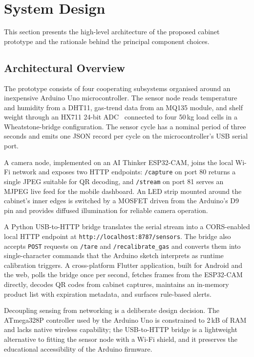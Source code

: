 \section{System Design}
\label{sec:systemdesign}

This section presents the high-level architecture of the proposed
cabinet prototype and the rationale behind the principal component
choices.

\subsection{Architectural Overview}

The prototype consists of four cooperating subsystems organised
around an inexpensive Arduino Uno microcontroller. The sensor node
reads temperature and humidity from a DHT11, gas-trend data from an
MQ135 module, and shelf weight through an HX711 24-bit
ADC~\cite{hx711datasheet} connected to four 50\,kg load cells in a
Wheatstone-bridge configuration. The sensor cycle has a nominal
period of three seconds and emits one JSON record per cycle on the
microcontroller's USB serial port.

A camera node, implemented on an AI Thinker ESP32-CAM, joins the
local Wi-Fi network and exposes two HTTP endpoints: \texttt{/capture}
on port 80 returns a single JPEG suitable for QR decoding, and
\texttt{/stream} on port 81 serves an MJPEG live feed for the mobile
dashboard. An LED strip mounted around the cabinet's inner edges is
switched by a MOSFET driven from the Arduino's D9 pin and provides
diffused illumination for reliable camera operation.

A Python USB-to-HTTP bridge translates the serial stream into a
CORS-enabled local HTTP endpoint at
\texttt{http://localhost:8787/sensors}. The bridge also accepts
\texttt{POST} requests on \texttt{/tare} and \texttt{/recalibrate\_gas}
and converts them into single-character commands that the Arduino
sketch interprets as runtime calibration triggers. A cross-platform
Flutter application, built for Android and the web, polls the bridge
once per second, fetches frames from the ESP32-CAM directly, decodes
QR codes from cabinet captures, maintains an in-memory product list
with expiration metadata, and surfaces rule-based alerts.

Decoupling sensing from networking is a deliberate design decision.
The ATmega328P controller used by the Arduino Uno is constrained to
2\,kB of RAM and lacks native wireless capability; the
USB-to-HTTP bridge is a lightweight alternative to fitting the
sensor node with a Wi-Fi shield, and it preserves the educational
accessibility of the Arduino firmware.

